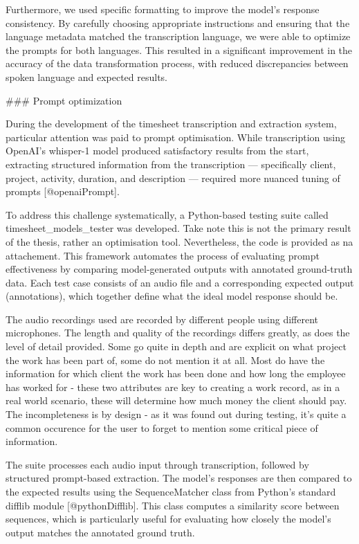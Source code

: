\documentclass[
  digital,     %
  oneside,     %
  nosansbold,  %
  nocolorbold, %
  lof,         %
  lot,         %
]{fithesis4}
\begin{document}
\begin{markdown}
Furthermore, we used specific formatting to improve the model’s response consistency. By carefully choosing appropriate instructions and ensuring that the language metadata matched the transcription language, we were able to optimize the prompts for both languages. This resulted in a significant improvement in the accuracy of the data transformation process, with reduced discrepancies between spoken language and expected results.

### Prompt optimization

During the development of the timesheet transcription and extraction system, particular attention was paid to prompt optimisation. While transcription using OpenAI's whisper-1 model produced satisfactory results from the start, extracting structured information from the transcription — specifically client, project, activity, duration, and description — required more nuanced tuning of prompts [@openaiPrompt].

To address this challenge systematically, a Python-based testing suite called timesheet_models_tester was developed. Take note this is not the primary result of the thesis, rather an optimisation tool. Nevertheless, the code is provided as na attachement. This framework automates the process of evaluating prompt effectiveness by comparing model-generated outputs with annotated ground-truth data. Each test case consists of an audio file and a corresponding expected output (annotations), which together define what the ideal model response should be.

The audio recordings used are recorded by different people using different microphones. The length and quality of the recordings differs greatly, as does the level of detail provided. Some go quite in depth and are explicit on what project the work has been part of, some do not mention it at all. Most do have the information for which client the work has been done and how long the employee has worked for - these two attributes are key to creating a work record, as in a real world scenario, these will determine how much money the client should pay. The incompleteness is by design - as it was found out during testing, it's quite a common occurence for the user to forget to mention some critical piece of information.

The suite processes each audio input through transcription, followed by structured prompt-based extraction. The model's responses are then compared to the expected results using the SequenceMatcher class from Python’s standard difflib module [@pythonDifflib]. This class computes a similarity score between sequences, which is particularly useful for evaluating how closely the model's output matches the annotated ground truth.


\end{markdown}
\end{document}

